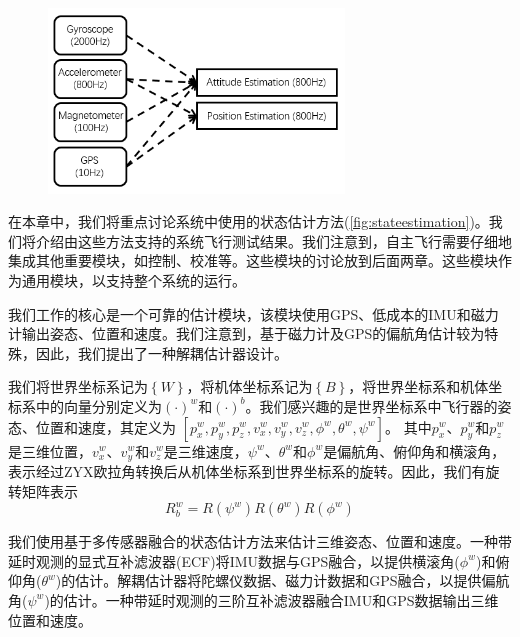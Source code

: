 \documentclass[
  type=master
]{gdutthesis}
\begin{document}
\begin{figure}[htbp]
	\centering
	\includegraphics[width=0.7\textwidth]{state estimation.png}
	\label{fig:stateestimation}
\end{figure} 

在本章中，我们将重点讨论系统中使用的状态估计方法(\autoref{fig:stateestimation})。我们将介绍由这些方法支持的系统飞行测试结果。我们注意到，自主飞行需要仔细地集成其他重要模块，如控制、校准等。这些模块的讨论放到后面两章。这些模块作为通用模块，以支持整个系统的运行。

我们工作的核心是一个可靠的估计模块，该模块使用GPS、低成本的IMU和磁力计输出姿态、位置和速度。我们注意到，基于磁力计及GPS的偏航角估计较为特殊，因此，我们提出了一种解耦估计器设计。\par
我们将世界坐标系记为$\left\{ W \right\}$，将机体坐标系记为$\left\{ B \right\}$，将世界坐标系和机体坐标系中的向量分别定义为$(\cdot)^w$和$(\cdot)^b$。我们感兴趣的是世界坐标系中飞行器的姿态、位置和速度，其定义为
$[p^w_x , p^w_y , p^w_z , v^w_x , v^w_y , v^w_z , \phi^w , \theta^w , \psi^w]$。
其中$p^w_x$、$p^w_y$和$p^w_z$是三维位置，$v^w_x$、$v^w_y$和$v^w_z$是三维速度，$\psi^w$、$\theta^w$和$\phi^w$是偏航角、俯仰角和横滚角，表示经过ZYX欧拉角转换后从机体坐标系到世界坐标系的旋转。因此，我们有旋转矩阵表示
\begin{equation}\label{eq:rotationmatrix}
	R_{b}^{w}=R(\psi^w)R(\theta^w)R(\phi^w)
\end{equation}\par
我们使用基于多传感器融合的状态估计方法来估计三维姿态、位置和速度。一种带延时观测的显式互补滤波器(ECF)将IMU数据与GPS融合，以提供横滚角($\phi^w$)和俯仰角($\theta^w$)的估计。解耦估计器将陀螺仪数据、磁力计数据和GPS融合，以提供偏航角($\psi^w$)的估计。一种带延时观测的三阶互补滤波器融合IMU和GPS数据输出三维位置和速度。
\end{document}
